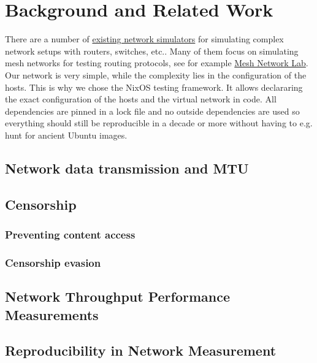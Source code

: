 
\chapter{Background and Related Work}
\label{chap:background}


There are a number of \href{https://brianlinkletter.com/2023/02/network-emulators-and-network-simulators-2023/}{existing network simulators} for simulating complex network setups with routers, switches, etc..
Many of them focus on simulating mesh networks for testing routing protocols, see for example \href{https://github.com/mwarning/meshnet-lab}{Mesh Network Lab}.
Our network is very simple, while the complexity lies in the configuration of the hosts.
This is why we chose the NixOS testing framework.
It allows declararing the exact configuration of the hosts and the virtual network in code.
All dependencies are pinned in a lock file and no outside dependencies are used so everything should still be reproducible in a decade or more without having to e.g. hunt for ancient Ubuntu images.

\section{Network data transmission and MTU}

\section{Censorship}
\subsection{Preventing content access}
\subsection{Censorship evasion}

\section{Network Throughput Performance Measurements}

\section{Reproducibility in Network Measurement}

